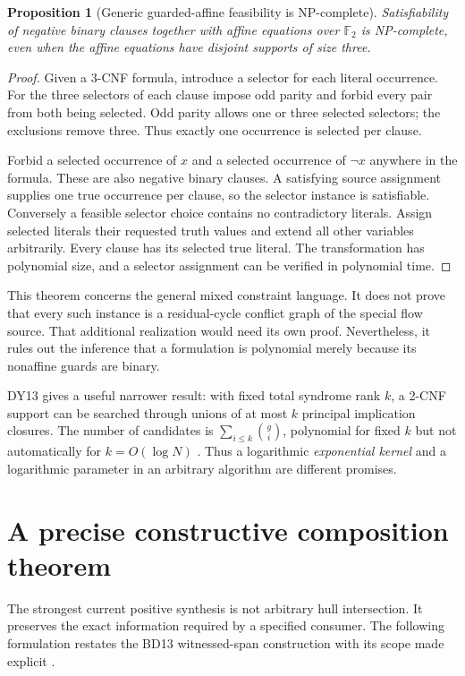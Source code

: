 \documentclass[11pt,letterpaper]{article}
\newtheorem{proposition}[theorem]{Proposition}
\theoremstyle{definition}
\newcommand{\F}{\mathbb F_2}
\begin{document}
\begin{proposition}[Generic guarded-affine feasibility is NP-complete]\label{prop:guardhard}
Satisfiability of negative binary clauses together with affine equations over $\F$ is NP-complete, even when the affine equations have disjoint supports of size three.
\end{proposition}
\begin{proof}
Given a 3-CNF formula, introduce a selector for each literal occurrence. For the three selectors of each clause impose odd parity and forbid every pair from both being selected. Odd parity allows one or three selected selectors; the exclusions remove three. Thus exactly one occurrence is selected per clause.

Forbid a selected occurrence of $x$ and a selected occurrence of $\neg x$ anywhere in the formula. These are also negative binary clauses. A satisfying source assignment supplies one true occurrence per clause, so the selector instance is satisfiable. Conversely a feasible selector choice contains no contradictory literals. Assign selected literals their requested truth values and extend all other variables arbitrarily. Every clause has its selected true literal. The transformation has polynomial size, and a selector assignment can be verified in polynomial time.
\end{proof}

This theorem concerns the general mixed constraint language. It does not prove that every such instance is a residual-cycle conflict graph of the special flow source. That additional realization would need its own proof. Nevertheless, it rules out the inference that a formulation is polynomial merely because its nonaffine guards are binary.

DY13 gives a useful narrower result: with fixed total syndrome rank $k$, a 2-CNF support can be searched through unions of at most $k$ principal implication closures. The number of candidates is $\sum_{i\le k}\binom gi$, polynomial for fixed $k$ but not automatically for $k=O(\log N)$ \cite{dy13}. Thus a logarithmic \emph{exponential kernel} and a logarithmic parameter in an arbitrary algorithm are different promises.

\section{A precise constructive composition theorem}

The strongest current positive synthesis is not arbitrary hull intersection. It preserves the exact information required by a specified consumer. The following formulation restates the BD13 witnessed-span construction with its scope made explicit \cite{bd13}.
\end{document}
